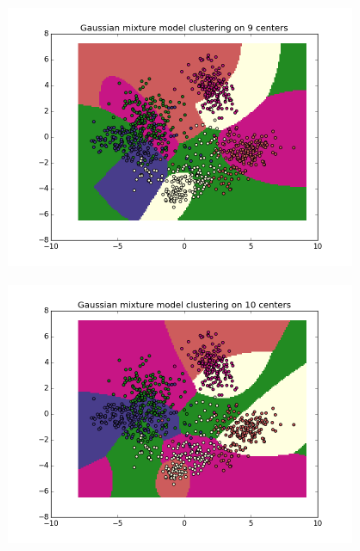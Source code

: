 \documentclass{article}
\begin{document}
\begin{center}
\begin{figure}
\centering  
        \begin{subfigure}[b]{0.48\textwidth}
                \centering
                \includegraphics[width=\linewidth]{figure_17}
        \end{subfigure}\hfill
        \begin{subfigure}[b]{0.48\textwidth}
                \centering
                \includegraphics[width=\linewidth]{figure_18}
        \end{subfigure}
        \label{fig:9}
\end{figure}
\end{center}	
\end{document}
